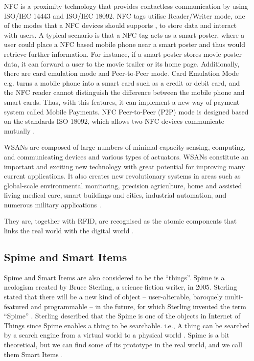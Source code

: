 NFC is a proximity technology that provides contactless communication by using ISO/IEC 14443 and ISO/IEC 18092. NFC tags utilise Reader/Writer mode, one of the modes that a NFC devices should supports \cite{Madlmayr:SecurityandPrivacy}, to store data and interact with users. A typical scenario is that a NFC tag acts as a smart poster, where a user could place a NFC based mobile phone near a smart poster and thus would retrieve further information. For instance, if a smart poster stores movie poster data, it can forward a user to the movie trailer or its home page. Additionally, there are card emulation mode and Peer-to-Peer mode. Card Emulation Mode e.g. turns a mobile phone into a smart card such as a credit or debit card, and the NFC reader cannot distinguish the difference between the mobile phone and smart cards. Thus, with this features, it can implement a new way of payment system called Mobile Payments. NFC Peer-to-Peer (P2P) mode is designed based on the standards ISO 18092, which allows two NFC devices communicate mutually \cite{Madlmayr:SecurityandPrivacy}.

WSANs are composed of large numbers of minimal capacity sensing, computing, and communicating devices and various types of actuators. WSANs constitute an important and exciting new technology with great potential for improving many current applications. It also creates new revolutionary systems in areas such as global-scale environmental monitoring, precision agriculture, home and assisted living medical care, smart buildings and cities, industrial automation, and numerous military applications \cite{stankovic2008sensor}. 

They are, together with RFID, are recognised as the atomic components that links the real world with the digital world \cite{sterling2005shaping}.

\subsection{Spime and Smart Items}

Spime and Smart Items are also considered to be the ``things''. Spime is a neologism created by Bruce Sterling, a science fiction writer, in 2005. Sterling stated that there will be a new kind of object -- user-alterable, baroquely multi-featured and programmable -- in the future, for which Sterling invented the term ``Spime'' \cite{sterling2005shaping}. Sterling described that the Spime is one of the objects in Internet of Things since Spime enables a thing to be searchable. i.e., A thing can be searched by a search engine from a virtual world to a physical world \cite{sterling2005shaping}. Spime is a bit theoretical, but we can find some of its prototype in the real world, and we call them Smart Items \cite{atzori2010internet}.

